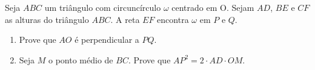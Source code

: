 Seja $ABC$ um triângulo com circuncírculo $\omega$ centrado em O.
Sejam $AD$, $BE$ e $CF$ as alturas do triângulo $ABC$. A reta $EF$ encontra $\omega$ em $P$ e $Q$.
\begin{enumerate}[label = (\alph*)]
	\item Prove que $AO$ é perpendicular a $PQ$.
	\item Seja $M$ o ponto médio de $BC$. Prove que $AP^2 = 2\cdot AD \cdot OM$.
\end{enumerate}
